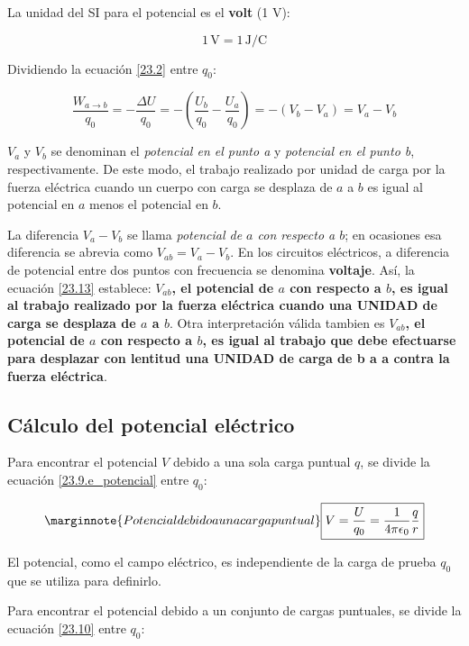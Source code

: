 La unidad del SI para el potencial es el \textbf{volt} (1 V):

\begin{equation*}
1\, \text{V}=1\, \text{J/C}
\end{equation*}

Dividiendo la ecuación \ref{23.2} entre $q_0$:

\begin{equation}\label{23.13}
\frac{W_{a\to b}}{q_0}=-\frac{\Delta U}{q_0}=-\left(\frac{U_b}{q_0}-\frac{U_a}{q_0}\right)=-(V_b-V_a)=V_a-V_b
\end{equation}

$V_a$ y $V_b$ se denominan el \textit{potencial en el punto a} y \textit{potencial en el punto b}, respectivamente. De este modo, el trabajo realizado por unidad de carga por la fuerza eléctrica cuando un cuerpo con carga se desplaza de $a$ a $b$ es igual al potencial en $a$ menos el potencial en $b$.

La diferencia $V_a-V_b$ se llama \textit{potencial de $a$ con respecto a $b$}; en ocasiones esa diferencia se abrevia como $V_{ab}=V_a-V_b$. En los circuitos eléctricos, a diferencia de potencial entre dos puntos con frecuencia se denomina \textbf{voltaje}. Así, la ecuación \ref{23.13} establece: \textbf{$V_{ab}$, el potencial de $a$ con respecto a $b$, es igual al trabajo realizado por la fuerza eléctrica cuando una UNIDAD de carga se desplaza de $a$ a $b$}. Otra interpretación válida tambien es \textbf{$V_{ab}$, el potencial de $a$ con respecto a $b$, es igual al trabajo que debe efectuarse para desplazar con lentitud una UNIDAD de carga de b a a contra la fuerza eléctrica}.

\subsection{Cálculo del potencial eléctrico}
Para encontrar el potencial $V$ debido a una sola carga puntual $q$, se divide la ecuación 	\ref{23.9.e_potencial} entre $q_0$:

\begin{equation}\label{23.14}\marginnote{Potencial debido a una carga puntual}
\boxed{V=\frac{U}{q_0}=\frac{1}{4\pi\epsilon_0}\frac{q}{r}}
\end{equation}

El potencial, como el campo eléctrico, es independiente de la carga de prueba $q_0$ que se utiliza para definirlo.

Para encontrar el potencial debido a un conjunto de cargas puntuales, se divide la ecuación \ref{23.10} entre $q_0$:

